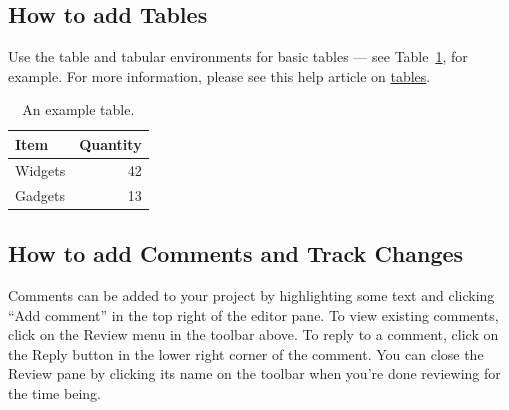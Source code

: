 \documentclass{book}
\begin{document}
\subsection{How to add Tables}

Use the table and tabular environments for basic tables --- see Table~\ref{tab:widgets}, for example. For more information, please see this help article on \href{https://www.overleaf.com/learn/latex/tables}{tables}.

\begin{table}
\centering
\begin{tabular}{l|r}
Item & Quantity \\\hline
Widgets & 42 \\
Gadgets & 13
\end{tabular}
\caption{\label{tab:widgets}An example table.}
\end{table}

\subsection{How to add Comments and Track Changes}

Comments can be added to your project by highlighting some text and clicking ``Add comment'' in the top right of the editor pane. To view existing comments, click on the Review menu in the toolbar above. To reply to a comment, click on the Reply button in the lower right corner of the comment. You can close the Review pane by clicking its name on the toolbar when you're done reviewing for the time being.
\end{document}
